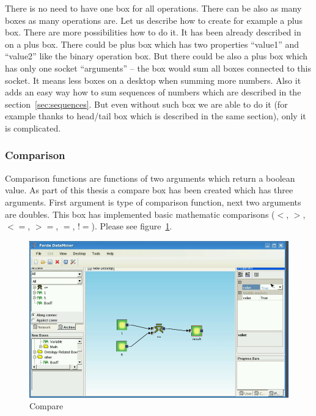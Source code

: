 \documentclass[a4paper,12pt]{book}
\begin{document}
There is no need to have one box for all operations. There can be also as many boxes as many operations are. Let us describe how to create for example a plus box. There are more possibilities how to do it. It has been already described in~\cite{znalosti2006} on a plus box. There could be plus box which has two properties ``value1'' and ``value2'' like the binary operation box. But there could be also a plus box which has only one socket ``arguments'' -- the box would sum all boxes connected to this socket. It means less boxes on a desktop when summing more numbers. Also it adds an easy way how to sum sequences of numbers which are described in the section~\ref{sec:sequences}. But even without such box we are able to do it (for example thanks to head/tail box which is described in the same section), only it is complicated.    

\subsubsection{Comparison}
Comparison functions are functions of two arguments which return a boolean value. As part of this thesis a compare box has been created which has three arguments. First argument is type of comparison function, next two arguments are doubles. This box has implemented basic mathematic comparisons ($<$, $>$, $<=$, $>=$, $=$, $!=$). Please see figure~\ref{fig:boxCompare}.
\begin{figure}
	\includegraphics[width=13.72cm]{compare2.png}
	\caption{Compare}
	\label{fig:boxCompare}
\end{figure}
\end{document}
